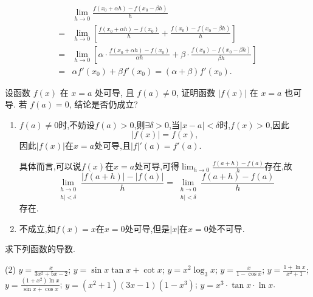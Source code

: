 \begin{solution}
    \begin{align*}
          & \lim_{h \to 0} \frac{f(x_0+\alpha h) - f(x_0-\beta h)}{h}                                                                                  \\
        = & \lim_{h \to 0} \left[ \frac{f(x_0+\alpha h) - f(x_0)}{h} + \frac{f(x_0) - f(x_0-\beta h)}{h} \right]                                       \\
        = & \lim_{h \to 0} \left[ \alpha \cdot \frac{f(x_0+\alpha h) - f(x_0)}{\alpha h} + \beta \cdot \frac{f(x_0) - f(x_0-\beta h)}{\beta h} \right] \\
        = & \alpha f'(x_0) + \beta f'(x_0) = (\alpha+\beta)f'(x_0).
    \end{align*}
\end{solution}

\begin{exercise}[3.1.5]
    设函数 $f(x)$ 在 $x=a$ 处可导, 且 $f(a) \ne 0$, 证明函数 $|f(x)|$ 在 $x=a$ 也可导. 若 $f(a)=0$, 结论是否仍成立?
\end{exercise}

\begin{solution}
    \begin{enumerate}
        \item $f(a) \neq 0$时,不妨设$f(a) > 0$,则$\exists \delta > 0$,当$|x-a| < \delta$时,$f(x) > 0$,因此
              $$|f(x)| = f(x),$$
              因此$|f(x)|$在$x=a$处可导,且$|f|'(a) = f'(a)$.

              \begin{remark}
                  具体而言,可以说$f(x)$在$x=a$处可导,可得$\lim_{h \to 0} \frac{f(a+h)-f(a)}{h}$存在,故$$\lim_{\substack{h \to 0\\h|< \delta}} \frac{|f(a+h)|-|f(a)|}{h} = \lim_{\substack{h \to 0\\h|< \delta}} \frac{f(a+h)-f(a)}{h}$$存在.
              \end{remark}
        \item 不成立,如$f(x) = x$在$x=0$处可导,但是$|x|$在$x=0$处不可导.
    \end{enumerate}
\end{solution}

\begin{exercise}[3.1.6]
    求下列函数的导数.
    \begin{tasks}[label=(\arabic*)](2)
        \task $y = \frac{x}{3x^2+5x-2}$;
        \task $y = \sin x \tan x + \cot x$;
        \task $y = x^2 \log_3 x$;
        \task $y = \frac{x}{1-\cos x}$;
        \task $y = \frac{1+\ln x}{x^2+1}$;
        \task $y = \frac{(1+x^2)\ln x}{\sin x + \cos x}$;
        \task $y = (x^2+1)(3x-1)(1-x^3)$;
        \task $y = x^3 \cdot \tan x \cdot \ln x$.
    \end{tasks}
\end{exercise}


